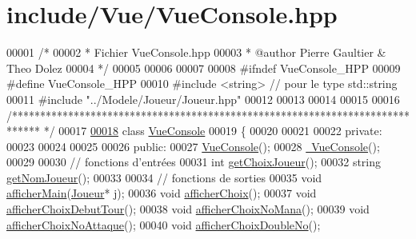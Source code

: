 \hypertarget{_vue_console_8hpp_source}{\section{include/\-Vue/\-Vue\-Console.hpp}
}

\begin{DoxyCode}
00001 \textcolor{comment}{/*}
00002 \textcolor{comment}{* Fichier VueConsole.hpp}
00003 \textcolor{comment}{* @author Pierre Gaultier & Theo Dolez}
00004 \textcolor{comment}{*/}
00005 
00006 
00007 
00008 \textcolor{preprocessor}{#ifndef VueConsole\_HPP}
00009 \textcolor{preprocessor}{}\textcolor{preprocessor}{#define VueConsole\_HPP}
00010 \textcolor{preprocessor}{}\textcolor{preprocessor}{#include <string>} \textcolor{comment}{// pour le type std::string}
00011 \textcolor{preprocessor}{#include "../Modele/Joueur/Joueur.hpp"}
00012 
00013 
00014 
00015 
00016 \textcolor{comment}{/*****************************************************************************
      */}
00017 
\hypertarget{_vue_console_8hpp_source_l00018}{}\hyperlink{class_vue_console}{00018} \textcolor{keyword}{class }\hyperlink{class_vue_console}{VueConsole}
00019 \{
00020 
00021 
00022     \textcolor{keyword}{private}:
00023 
00024  
00025     
00026     \textcolor{keyword}{public}:
00027         \hyperlink{class_vue_console_a3fc6ba85609459d0919cf9ad4fc1056a}{VueConsole}();
00028         \hyperlink{class_vue_console_a84554327c266781a3ee5422e1dba674b}{~VueConsole}();
00029         
00030         \textcolor{comment}{// fonctions d'entrées}
00031         \textcolor{keywordtype}{int} \hyperlink{class_vue_console_a8a2212cbdd27511f92f29c222957c80c}{getChoixJoueur}();
00032         \textcolor{keywordtype}{string} \hyperlink{class_vue_console_a5340da9b0a7fad73fe91b26ec6b20f3b}{getNomJoueur}();
00033 
00034         \textcolor{comment}{// fonctions de sorties}
00035         \textcolor{keywordtype}{void} \hyperlink{class_vue_console_a0782f21077f7c1be22e798ec445a4d87}{afficherMain}(\hyperlink{class_joueur}{Joueur}* j);
00036         \textcolor{keywordtype}{void} \hyperlink{class_vue_console_a44d91e29edaa189252dedd1ee643619d}{afficherChoix}();
00037         \textcolor{keywordtype}{void} \hyperlink{class_vue_console_a80c7dcfb3eb9a381b37ba46a7ac366af}{afficherChoixDebutTour}();
00038         \textcolor{keywordtype}{void} \hyperlink{class_vue_console_aeda02f293126db8b72755d223fe2b0e0}{afficherChoixNoMana}();
00039         \textcolor{keywordtype}{void} \hyperlink{class_vue_console_a52c6059b31bcca4000d94fd2578363b8}{afficherChoixNoAttaque}();
00040         \textcolor{keywordtype}{void} \hyperlink{class_vue_console_af38fecfa458f233e81f2beeda1610ec3}{afficherChoixDoubleNo}();

\end{DoxyCode}
